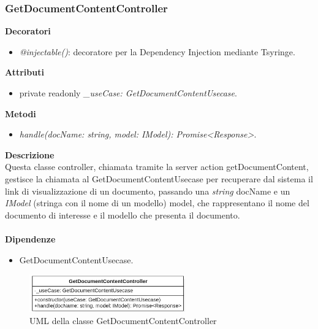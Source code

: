 \subsubsection{GetDocumentContentController}
\textbf{Decoratori}
\begin{itemize}
    \item \textit{@injectable()}: decoratore per la Dependency Injection mediante Tsyringe.
\end{itemize}
\textbf{Attributi}
\begin{itemize}
    \item private readonly \textit{\_useCase: GetDocumentContentUsecase}.
\end{itemize}
\textbf{Metodi}
\begin{itemize}
    \item \textit{handle(docName: string, model: IModel): Promise<Response>}.
\end{itemize}
\textbf{Descrizione}\\
Questa classe controller, chiamata tramite la server action getDocumentContent, gestisce la chiamata al GetDocumentContentUsecase per recuperare dal sistema il link di visualizzazione di un documento, passando una \textit{string} docName e un \textit{IModel} (stringa con il nome di un modello) model, che rappresentano il nome del documento di interesse e il modello che presenta il documento.\\ \\
\textbf{Dipendenze}
\begin{itemize}
    \item GetDocumentContentUsecase.
\end{itemize}

\begin{figure}[h!]
    \centering  
    \includegraphics[width=0.6\textwidth]{GetDocumentContentController.png}
    \caption{UML della classe GetDocumentContentController}
\end{figure}

